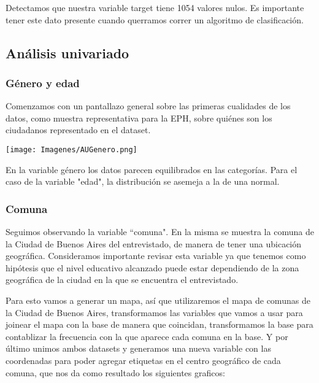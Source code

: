 \documentclass[a4paper]{article}
\begin{document}
    Detectamos que nuestra variable target tiene 1054 valores nulos. Es importante tener este dato presente cuando querramos correr un algoritmo de clasificación.

    \subsection{Análisis univariado}

        \subsubsection{Género y edad}
            
            Comenzamos con un pantallazo general sobre las primeras cualidades de los datos, como muestra representativa para la EPH, sobre quiénes son los ciudadanos representado en el dataset.
            
            \begin{center}
                \texttt{[image: Imagenes/AUGenero.png]}    
            \end{center}
            

            En la variable género los datos parecen equilibrados en las categorías. Para el caso de la variable "edad", la distribución se asemeja a la de una normal.
            
            \subsubsection{Comuna}
            
            Seguimos observando la variable ``comuna". En la misma se muestra la comuna de la Ciudad de Buenos Aires del entrevistado, de manera de tener una ubicación geográfica. Consideramos importante revisar esta variable ya que tenemos como hipótesis que el nivel educativo alcanzado puede estar dependiendo de la zona geográfica de la ciudad en la que se encuentra el entrevistado.
            
            Para esto vamos a generar un mapa, así que utilizaremos el mapa de comunas de la Ciudad de Buenos Aires, transformamos las variables que vamos a usar para joinear el mapa con la base de manera que coincidan, transformamos la base para contablizar la frecuencia con la que aparece cada comuna en la base. Y por último unimos ambos datasets y generamos una nueva variable con las coordenadas para poder agregar etiquetas en el centro geográfico de cada comuna, que nos da como resultado los siguientes graficos:
            
\end{document}
